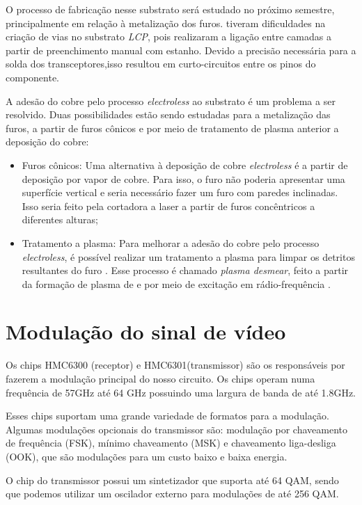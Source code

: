 O processo de fabricação nesse substrato será estudado no próximo semestre, principalmente em relação à metalização dos furos. \citeauthor{TCC} tiveram dificuldades na criação de vias no substrato \textit{LCP}, pois realizaram a ligação entre camadas a partir de preenchimento manual com estanho. Devido a precisão necessária para a solda dos transceptores,isso resultou em curto-circuitos entre os pinos do componente.

A adesão do cobre pelo processo \textit{electroless} ao substrato é um problema a ser resolvido. Duas possibilidades estão sendo estudadas para a metalização das furos, a partir de furos cônicos e por meio de tratamento de plasma anterior a deposição do cobre:
\begin{itemize}
    \item Furos cônicos: Uma alternativa à deposição de cobre \textit{electroless} é a partir de deposição por vapor de cobre. Para isso, o furo não poderia apresentar uma superfície vertical e seria necessário fazer um furo com paredes inclinadas. Isso seria feito pela cortadora a laser a partir de furos concêntricos a diferentes alturas;
    \item Tratamento a plasma: Para melhorar a adesão do cobre pelo processo \textit{electroless}, é possível realizar um tratamento a plasma para limpar os detritos resultantes do furo \cite{zhang2002processing}. Esse processo é chamado \textit{plasma desmear}, feito a partir da formação de plasma de  e  por meio de excitação em rádio-frequência \cite{7478111}.
\end{itemize}

\section{Modulação do sinal de vídeo}

Os chips HMC6300 (receptor) e HMC6301(transmissor) são os responsáveis por fazerem a modulação principal do nosso circuito. Os chips operam numa frequência de 57GHz até 64 GHz possuindo uma largura de banda de até 1.8GHz. 

Esses chips suportam uma grande variedade de formatos para a modulação. Algumas modulações opcionais do transmissor são: modulação por chaveamento de frequência (FSK), mínimo chaveamento (MSK) e chaveamento liga-desliga (OOK), que são modulações para um custo baixo e baixa energia.

O chip do transmissor possui um sintetizador que suporta até 64 QAM, sendo que podemos utilizar um oscilador externo para modulações de até 256 QAM.

